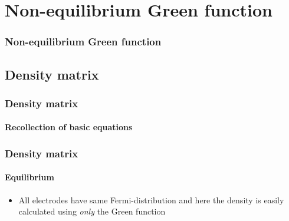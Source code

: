 \section{Non-equilibrium Green function}

\begin{framenologo}
  \frametitle{Non-equilibrium Green function}
  \tableofcontents[currentsection]
\end{framenologo}

\subsection{Density matrix}

\begin{frame}
  \frametitle{Density matrix}
  \framesubtitle{Recollection of basic equations}


\end{frame}

\begin{frame}
  \frametitle{Density matrix}
  \framesubtitle{Equilibrium}

  \begin{itemize}
    \item All electrodes have same Fermi-distribution and here the density is easily
    calculated using \emph{only} the Green function
  \end{itemize}


\end{frame}


